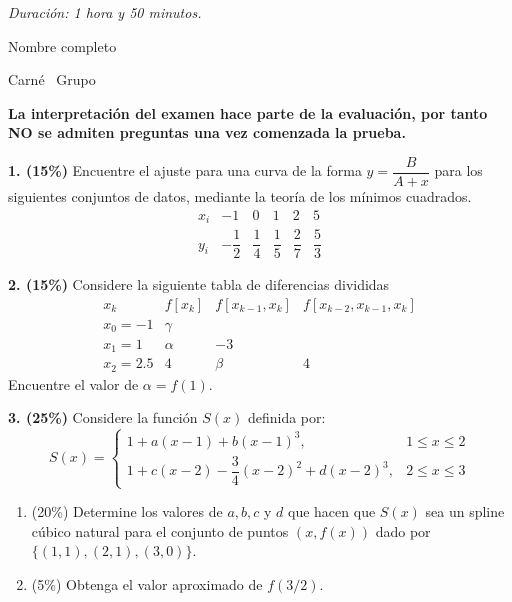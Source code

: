 \documentclass[11pt]{article}
\begin{document}
\examheader

\vspace{4pt}
\noindent\textit{Duración: 1 hora y 50 minutos.}

\vspace{6pt}
\noindent Nombre completo \dotfill

\noindent Carné \dotfill\ Grupo \dotfill

\vspace{8pt}
\noindent\textbf{La interpretación del examen hace parte de la evaluación, por tanto NO se admiten preguntas una vez comenzada la prueba.}

\vspace{10pt}
\noindent\textbf{1. (15\%)} Encuentre el ajuste para una curva de la forma $y=\dfrac{B}{A+x}$ para los siguientes conjuntos de datos, mediante la teoría de los mínimos cuadrados.
\[
\begin{array}{c|c|c|c|c|c}
x_i & -1 & 0 & 1 & 2 & 5\\ \hline
y_i & -\dfrac12 & \dfrac14 & \dfrac15 & \dfrac27 & \dfrac53
\end{array}
\]

\vspace{5mm}
\noindent\textbf{2. (15\%)} Considere la siguiente tabla de diferencias divididas
\[
\begin{array}{c|c|c|c}
x_k & f[x_k] & f[x_{k-1},x_k] & f[x_{k-2},x_{k-1},x_k]\\ \hline
x_0=-1 & \gamma & & \\
x_1=1 & \alpha & -3 & \\
x_2=2.5 & 4 & \beta & 4
\end{array}
\]
Encuentre el valor de $\alpha=f(1)$.

\vspace{5mm}
\noindent\textbf{3. (25\%)} Considere la función $S(x)$ definida por:
\[
S(x)=\begin{cases}
1+a(x-1)+b(x-1)^3, & 1\leq x\leq 2\\
1+c(x-2)-\dfrac34(x-2)^2+d(x-2)^3, & 2\leq x\leq 3
\end{cases}
\]
\begin{enumerate}
\item[a.] (20\%) Determine los valores de $a,b,c$ y $d$ que hacen que $S(x)$ sea un spline cúbico natural para el conjunto de puntos $(x,f(x))$ dado por $\{(1,1),(2,1),(3,0)\}$.
\item[b.] (5\%) Obtenga el valor aproximado de $f(3/2)$.
\end{enumerate}
\end{document}
